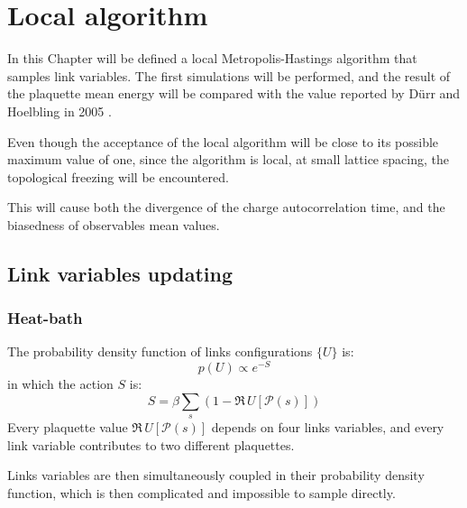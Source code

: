 \chapter{Local algorithm}\label{ch:local}

In this Chapter will be defined a local Metropolis-Hastings algorithm that samples link variables.
The first simulations will be performed,
and the result of the plaquette mean energy will be compared with the value reported by D\"urr and Hoelbling in 2005 \cite{durr-hoelbling:2005}.

Even though the acceptance of the local algorithm will be close to its possible maximum value of one,
since the algorithm is local, at small lattice spacing, the topological freezing will be encountered.

This will cause both the divergence of the charge autocorrelation time,
and the biasedness of observables mean values.

\section{Link variables updating}
\subsection*{Heat-bath}
The probability density function of links configurations $\{U\}$ is:
\[
    p(U) \propto e^{-S}
\]
in which the action $S$ is:
\[
    S = \beta\sum_s\left(1-\Re\,U[\mathcal P(s)]\right)
\]
Every plaquette value $\Re\,U[\mathcal P(s)]$ depends on four links variables,
and every link variable contributes to two different plaquettes.

Links variables are then simultaneously coupled in their probability density function,
which is then complicated and impossible to sample directly.


